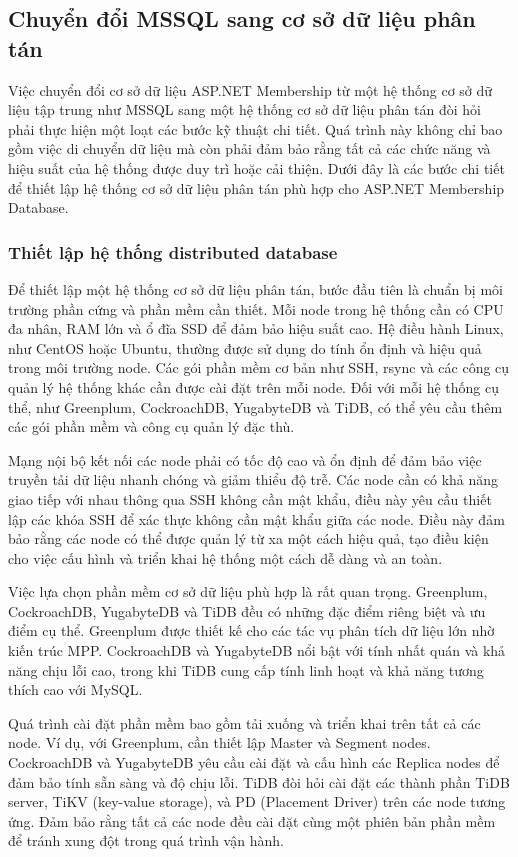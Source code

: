 \documentclass[14pt]{article}
\begin{document}
\subsection{Chuyển đổi MSSQL sang cơ sở dữ liệu phân tán}

Việc chuyển đổi cơ sở dữ liệu ASP.NET Membership từ một hệ thống cơ sở dữ liệu tập trung như MSSQL sang một hệ thống cơ sở dữ liệu phân tán đòi hỏi phải thực hiện một loạt các bước kỹ thuật chi tiết. Quá trình này không chỉ bao gồm việc di chuyển dữ liệu mà còn phải đảm bảo rằng tất cả các chức năng và hiệu suất của hệ thống được duy trì hoặc cải thiện. Dưới đây là các bước chi tiết để thiết lập hệ thống cơ sở dữ liệu phân tán phù hợp cho ASP.NET Membership Database.

\subsubsection{Thiết lập hệ thống distributed database}

Để thiết lập một hệ thống cơ sở dữ liệu phân tán, bước đầu tiên là chuẩn bị môi trường phần cứng và phần mềm cần thiết. Mỗi node trong hệ thống cần có CPU đa nhân, RAM lớn và ổ đĩa SSD để đảm bảo hiệu suất cao. Hệ điều hành Linux, như CentOS hoặc Ubuntu, thường được sử dụng do tính ổn định và hiệu quả trong môi trường node. Các gói phần mềm cơ bản như SSH, rsync và các công cụ quản lý hệ thống khác cần được cài đặt trên mỗi node. Đối với mỗi hệ thống cụ thể, như Greenplum, CockroachDB, YugabyteDB và TiDB, có thể yêu cầu thêm các gói phần mềm và công cụ quản lý đặc thù.

Mạng nội bộ kết nối các node phải có tốc độ cao và ổn định để đảm bảo việc truyền tải dữ liệu nhanh chóng và giảm thiểu độ trễ. Các node cần có khả năng giao tiếp với nhau thông qua SSH không cần mật khẩu, điều này yêu cầu thiết lập các khóa SSH để xác thực không cần mật khẩu giữa các node. Điều này đảm bảo rằng các node có thể được quản lý từ xa một cách hiệu quả, tạo điều kiện cho việc cấu hình và triển khai hệ thống một cách dễ dàng và an toàn.

Việc lựa chọn phần mềm cơ sở dữ liệu phù hợp là rất quan trọng. Greenplum, CockroachDB, YugabyteDB và TiDB đều có những đặc điểm riêng biệt và ưu điểm cụ thể. Greenplum được thiết kế cho các tác vụ phân tích dữ liệu lớn nhờ kiến trúc MPP. CockroachDB và YugabyteDB nổi bật với tính nhất quán và khả năng chịu lỗi cao, trong khi TiDB cung cấp tính linh hoạt và khả năng tương thích cao với MySQL.

Quá trình cài đặt phần mềm bao gồm tải xuống và triển khai trên tất cả các node. Ví dụ, với Greenplum, cần thiết lập Master và Segment nodes. CockroachDB và YugabyteDB yêu cầu cài đặt và cấu hình các Replica nodes để đảm bảo tính sẵn sàng và độ chịu lỗi. TiDB đòi hỏi cài đặt các thành phần TiDB server, TiKV (key-value storage), và PD (Placement Driver) trên các node tương ứng. Đảm bảo rằng tất cả các node đều cài đặt cùng một phiên bản phần mềm để tránh xung đột trong quá trình vận hành.
\end{document}
